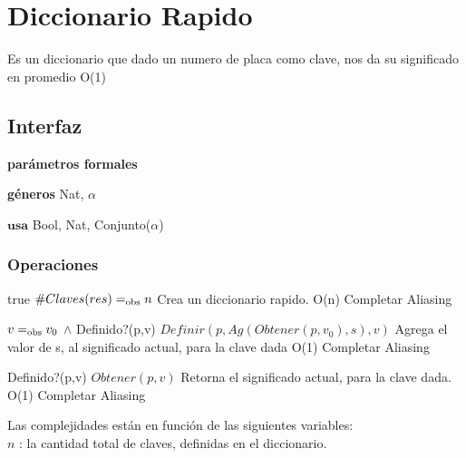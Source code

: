 
\section{Diccionario Rapido}

Es un diccionario que dado un numero de placa como clave, nos da su significado en promedio O(1)

\subsection{Interfaz}

  \textbf{par\'ametros formales}
  
  \textbf{g\'eneros} Nat, $\alpha$\\


$\textbf{usa}$  
Bool, Nat, Conjunto($\alpha$)



\subsubsection*{Operaciones}


 {true}
 {$\#Claves(res) =_{\mathrm{obs}} n$}
 {Crea un diccionario rapido.}
 {O(n)}
 {Completar Aliasing}

 {$v =_{\mathrm{obs}} v_0$ $\land$ Definido?(p,v)}
 {$Definir(p , Ag(Obtener(p,v_0),s) , v)$}
 {Agrega el valor de s, al significado actual, para la clave dada}
 {O(1)}
 {Completar Aliasing}

 {Definido?(p,v)}
 {$Obtener(p,v)$}
 {Retorna el significado actual, para la clave dada.}
 {O(1)}
 {Completar Aliasing}
 
Las complejidades est\'an en funci\'on de las siguientes variables:\\
$n$ : la cantidad total de claves, definidas en el diccionario. \\
\\ \\



